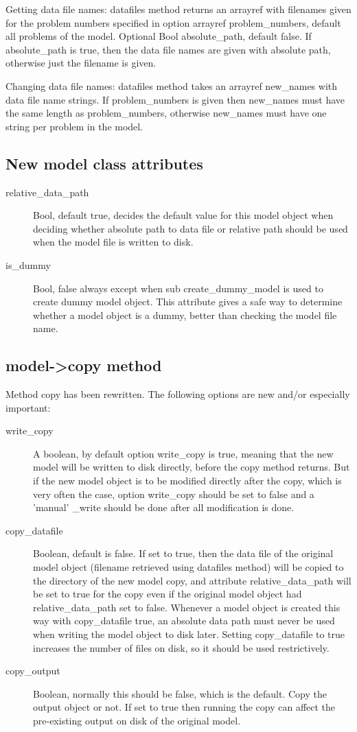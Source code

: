 Getting data file names: datafiles method returns an arrayref with filenames given for the problem numbers specified in option arrayref problem\_numbers,
default all problems of the model. Optional Bool absolute\_path, default false. If absolute\_path is true, then the data file names
are given with absolute path, otherwise just the filename is given. 

Changing data file names: datafiles method takes an arrayref new\_names with data file name strings. If problem\_numbers is
given then new\_names must have the same length as problem\_numbers, otherwise new\_names must have one string
per problem in the model.

\subsection{New model class attributes}
\begin{description}
\item[relative\_data\_path] Bool, default true, decides the default value for this model object when
deciding whether absolute path to data file or relative path should be used when the model file is written to disk.
\item[is\_dummy] Bool, false always except when sub create\_dummy\_model is used to create dummy model object. This attribute
gives a safe way to determine whether a model object is a dummy, better than checking the model file name.
\end{description}

\subsection{model->copy method}
Method copy has been rewritten. The following options are new and/or especially important:
\begin{description}
\item[write\_copy] A boolean, by default option write\_copy is true, meaning that the new model will be written to disk 
directly, before the copy method returns. But if the new model object is to be modified directly after the copy,
which is very often the case, option write\_copy should be set to false and a 'manual' \_write should be done
after all modification is done.
\item[copy\_datafile] Boolean, default is false. If set to true, then the data file of the original model object (filename 
retrieved using datafiles method) will be copied to the directory of the new model copy, and attribute 
relative\_data\_path will be set to true for the copy even if the original model object had
relative\_data\_path set to false.
Whenever a model object is created this way with copy\_datafile true, an absolute data path must never
be used when writing the model object to disk later.
Setting copy\_datafile to true increases the number of files on disk, so it should be used restrictively.
\item[copy\_output] Boolean, normally this should be false, which is the default. Copy the output object or not.
If set to true then running the copy can affect the pre-existing output on disk of the original model. 
\end{description}

